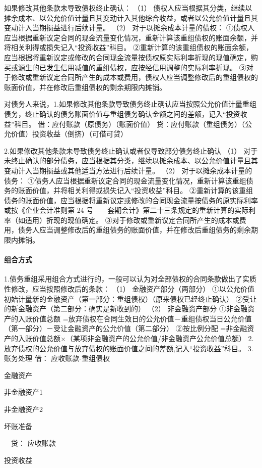 \documentclass[UTF8,12pt]{ctexart}
\newenvironment{Dr}{\noindent 借：}{\par}
\newenvironment{Cr}{\noindent \ \ 贷：}{\par}
\numberwithin{equation}{section} %
\numberwithin{figure}{section}
\numberwithin{table}{section}
\begin{document}
	如果修改其他条款未导致债权终止确认：
	（1）	债权人应当根据其分类，继续以摊余成本、以公允价值计量且其变动计入其他综合收益，或者以公允价值计量且其变动计入当期损益进行后续计量。
	（2）	对于以摊余成本计量的债权：
	①债权人应当根据重新议定合同的现金流量变化情况，重新计算该重组债权的账面余额，并将相关利得或损失记入“投资收益”科目。
	②重新计算的该重组债权的账面余额，应当根据将重新议定或修改的合同现金流量按债权原实际利率折现的现值确定，购买或源生的已发生信用减值的重组债权，应按经信用调整的实际利率折现。
	③对于修改或重新议定合同所产生的成本或费用，债权人应当调整修改后的重组债权的账面价值，并在修改后重组债权的剩余期限内摊销。
	
	对债务人来说，1.如果修改其他条款导致债务终止确认应当按照公允价值计量重组债务，终止确认的债务账面价值与重组债务确认金额之间的差额，记入“投资收益”科目。
	借：应付账款（原债务）（账面价值）
	贷：应付账款（重组债务）（公允价值）投资收益（倒挤）（可借可贷）
	
	2.如果修改其他条款未导致债务终止确认或者仅导致部分债务终止确认
	（1）	对于未终止确认的部分债务，应当根据其分类，继续以摊余成本、以公允价值计量且其变动计入当期损益或其他适当方法进行后续计量。
	（2）	对于以摊余成本计量的债务：
	①债务人应当根据重新议定合同的现金流量变化情况，重新计算该重组债务的账面价值，并将相关利得或损失记入“投资收益”科目。
	②重新计算的该重组债务的账面价值，应当根据将重新议定或修改的合同现金流量按债务的原实际利率或按《企业会计准则第 24 号——套期会计》第二十三条规定的重新计算的实际利率（如适用）折现的现值确定。
	③对于修改或重新议定合同所产生的成本或费用，债务人应当调整修改后的重组债务的账面价值，并在修改后重组债务的剩余期限内摊销。
	
	\paragraph{组合方式}
	1.债务重组采用组合方式进行的，一般可以认为对全部债权的合同条款做出了实质性修改，应当按照修改后的条款：
	（1）	金融资产部分（两部分）
	①以公允价值初始计量新的金融资产（第一部分：重组债权）（原来债权已经终止确认）
	②受让的新金融资产（第二部分：确实是新收到的）
	（2）	非金融资产部分
	①非金融资产的入账价值总额
	=放弃债权在合同生效日的公允价值－重组债权当日公允价值（第一部分）－受让金融资产的公允价值（第二部分）
	②按比例分配
	=非金融资产的入账价值总额×（某项非金融资产的公允价值/非金融资产公允价值总额） 
	2.放弃债权的公允价值与放弃债权的账面价值之间的差额,记入“投资收益”科目。
	3.账务处理
	\begin{Dr}
		应收账款-重组债权
		
		金融资产
		
		非金融资产1
		
		非金融资产2
		
		坏账准备
	\end{Dr}
	\begin{Cr}
		应收账款
		
		投资收益
	\end{Cr}
	
\end{document}
